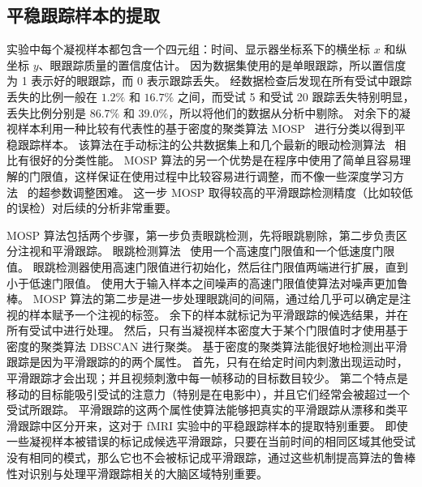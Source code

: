 

\subsection{平稳跟踪样本的提取}
实验中每个凝视样本都包含一个四元组：时间、显示器坐标系下的横坐标 $x$ 和纵坐标 $y$、眼跟踪质量的置信度估计。
因为数据集使用的是单眼跟踪，所以置信度为 1 表示好的眼跟踪，而 0 表示跟踪丢失。
经数据检查后发现在所有受试中跟踪丢失的比例一般在 $1.2\%$ 和 $16.7\%$ 之间，而受试 5 和受试 20 跟踪丢失特别明显，丢失比例分别是 $86.7\%$ 和 $39.0\%$，所以将他们的数据从分析中剔除。
%
对余下的凝视样本利用一种比较有代表性的基于密度的聚类算法 MOSP~\cite{mosp,mosp_imp} 进行分类以得到平稳跟踪样本。
该算法在手动标注的公共数据集上和几个最新的眼动检测算法~\cite{fix_sp_det,remodnav} 相比有很好的分类性能。
MOSP 算法的另一个优势是在程序中使用了简单且容易理解的门限值，这样保证在使用过程中比较容易进行调整，而不像一些深度学习方法~\cite{auto_classification,gazenet} 的超参数调整困难。
这一步 MOSP 取得较高的平滑跟踪检测精度（比如较低的误检）对后续的分析非常重要。

MOSP 算法包括两个步骤，第一步负责眼跳检测，先将眼跳剔除，第二步负责区分注视和平滑跟踪。
眼跳检测算法~\cite{var_natural} 使用一个高速度门限值和一个低速度门限值。
眼跳检测器使用高速门限值进行初始化，然后往门限值两端进行扩展，直到小于低速门限值。
使用大于输入样本之间噪声的高速门限值使算法对噪声更加鲁棒。
MOSP 算法的第二步是进一步处理眼跳间的间隔，通过给几乎可以确定是注视的样本赋予一个注视的标签。
余下的样本就标记为平滑跟踪的候选结果，并在所有受试中进行处理。
然后，只有当凝视样本密度大于某个门限值时才使用基于密度的聚类算法 DBSCAN 进行聚类。
基于密度的聚类算法能很好地检测出平滑跟踪是因为平滑跟踪的的两个属性。
% 
首先，只有在给定时间内刺激出现运动时，平滑跟踪才会出现；并且视频刺激中每一帧移动的目标数目较少。
%
第二个特点是移动的目标能吸引受试的注意力（特别是在电影中），并且它们经常会被超过一个受试所跟踪。
平滑跟踪的这两个属性使算法能够把真实的平滑跟踪从漂移和类平滑跟踪中区分开来，这对于 fMRI 实验中的平稳跟踪样本的提取特别重要。
即使一些凝视样本被错误的标记成候选平滑跟踪，只要在当前时间的相同区域其他受试没有相同的模式，那么它也不会被标记成平滑跟踪，通过这些机制提高算法的鲁棒性对识别与处理平滑跟踪相关的大脑区域特别重要。


